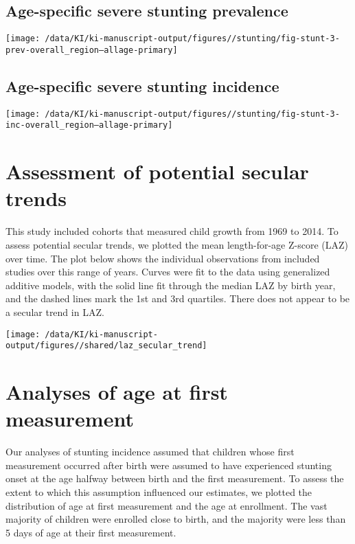 \documentclass[
  9pt,
]{book}
\begin{document}
\hypertarget{age-specific-severe-stunting-prevalence}{%
\section{Age-specific severe stunting prevalence}\label{age-specific-severe-stunting-prevalence}}

\texttt{[image: /data/KI/ki-manuscript-output/figures//stunting/fig-stunt-3-prev-overall\_region--allage-primary]}

\hypertarget{age-specific-severe-stunting-incidence}{%
\section{Age-specific severe stunting incidence}\label{age-specific-severe-stunting-incidence}}

\texttt{[image: /data/KI/ki-manuscript-output/figures//stunting/fig-stunt-3-inc-overall\_region--allage-primary]}

\hypertarget{secular-trends}{%
\chapter{Assessment of potential secular trends}\label{secular-trends}}

\raggedright

This study included cohorts that measured child growth from 1969 to 2014. To assess potential secular trends, we plotted the mean length-for-age Z-score (LAZ) over time. The plot below shows the individual observations from included studies over this range of years. Curves were fit to the data using generalized additive models, with the solid line fit through the median LAZ by birth year, and the dashed lines mark the 1st and 3rd quartiles. There does not appear to be a secular trend in LAZ.

\texttt{[image: /data/KI/ki-manuscript-output/figures//shared/laz\_secular\_trend]}

\hypertarget{age-meas}{%
\chapter{Analyses of age at first measurement}\label{age-meas}}

\raggedright

Our analyses of stunting incidence assumed that children whose first measurement occurred after birth were assumed to have experienced stunting onset at the age halfway between birth and the first measurement. To assess the extent to which this assumption influenced our estimates, we plotted the distribution of age at first measurement and the age at enrollment. The vast majority of children were enrolled close to birth, and the majority were less than 5 days of age at their first measurement.
\end{document}
